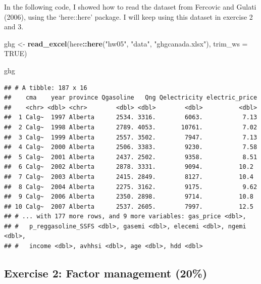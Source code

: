 \documentclass[]{article}
\newenvironment{Shaded}{\begin{snugshade}}{\end{snugshade}}
\newcommand{\CommentTok}[1]{\textcolor[rgb]{0.56,0.35,0.01}{\textit{#1}}}
\newcommand{\DataTypeTok}[1]{\textcolor[rgb]{0.13,0.29,0.53}{#1}}
\newcommand{\KeywordTok}[1]{\textcolor[rgb]{0.13,0.29,0.53}{\textbf{#1}}}
\newcommand{\NormalTok}[1]{#1}
\newcommand{\OperatorTok}[1]{\textcolor[rgb]{0.81,0.36,0.00}{\textbf{#1}}}
\newcommand{\OtherTok}[1]{\textcolor[rgb]{0.56,0.35,0.01}{#1}}
\newcommand{\StringTok}[1]{\textcolor[rgb]{0.31,0.60,0.02}{#1}}
\begin{document}
In the following code, I showed how to read the dataset from Fercovic
and Gulati (2006), using the `here::here' package. I will keep using
this dataset in exercise 2 and 3.

\begin{Shaded}
\begin{Highlighting}[]
\NormalTok{ghg <-}\StringTok{ }\KeywordTok{read_excel}\NormalTok{(here}\OperatorTok{::}\KeywordTok{here}\NormalTok{(}\StringTok{"hw05"}\NormalTok{, }\StringTok{"data"}\NormalTok{, }\StringTok{"ghgcanada.xlsx"}\NormalTok{), }\DataTypeTok{trim_ws =} \OtherTok{TRUE}\NormalTok{)}

\NormalTok{ghg}
\end{Highlighting}
\end{Shaded}

\begin{verbatim}
## # A tibble: 187 x 16
##    cma    year province Qgasoline   Qng Qelectricity electric_price
##    <chr> <dbl> <chr>        <dbl> <dbl>        <dbl>          <dbl>
##  1 Calg~  1997 Alberta      2534. 3316.        6063.           7.13
##  2 Calg~  1998 Alberta      2789. 4053.       10761.           7.02
##  3 Calg~  1999 Alberta      2557. 3502.        7947.           7.13
##  4 Calg~  2000 Alberta      2506. 3383.        9230.           7.58
##  5 Calg~  2001 Alberta      2437. 2502.        9358.           8.51
##  6 Calg~  2002 Alberta      2878. 3331.        9094.          10.2 
##  7 Calg~  2003 Alberta      2415. 2849.        8127.          10.4 
##  8 Calg~  2004 Alberta      2275. 3162.        9175.           9.62
##  9 Calg~  2006 Alberta      2350. 2898.        9714.          10.8 
## 10 Calg~  2007 Alberta      2537. 2605.        7997.          12.5 
## # ... with 177 more rows, and 9 more variables: gas_price <dbl>,
## #   p_reggasoline_SSFS <dbl>, gasemi <dbl>, elecemi <dbl>, ngemi <dbl>,
## #   income <dbl>, avhhsi <dbl>, age <dbl>, hdd <dbl>
\end{verbatim}

\begin{Shaded}
\end{Shaded}

\hypertarget{exercise-2-factor-management-20}{%
\subsection{Exercise 2: Factor management
(20\%)}\label{exercise-2-factor-management-20}}
\end{document}
